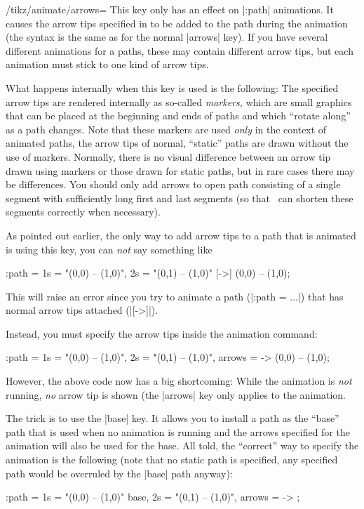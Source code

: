 \begin{key}{/tikz/animate/arrows=}
    This key only has an effect on |:path| animations. It causes the arrow tips
    specified in  to be added to the path during the animation
    (the syntax is the same as for the normal |arrows| key). If you have
    several different animations for a paths, these may contain different arrow
    tips, but each animation must stick to one kind of arrow tips.

    What happens internally when this key is used is the following: The
    specified arrow tips are rendered internally as so-called \emph{markers,}
    which are small graphics that can be placed at the beginning and ends of
    paths and which ``rotate along'' as a path changes. Note that these markers
    are used \emph{only} in the context of animated paths, the arrow tips of
    normal, ``static'' paths are drawn without the use of markers. Normally,
    there is no visual difference between an arrow tip drawn using markers or
    those drawn for static paths, but in rare cases there may be differences.
    You should only add arrows to open path consisting of a single segment with
    sufficiently long first and last segments (so that \tikzname\ can shorten
    these segments correctly when necessary).

    As pointed out earlier, the only way to add arrow tips to a path that is
    animated is using this key, you can \emph{not} say something like
\begin{codeexample}
\draw :path = { 1s = "{(0,0) -- (1,0)}", 2s = "{(0,1) -- (1,0)}" }
  [->] (0,0) -- (1,0);
\end{codeexample}
    This will raise an error since you try to animate a path (|:path = ...|)
    that has normal arrow tips attached (|[->]|).

    Instead, you must specify the arrow tips inside the animation command:
\begin{codeexample}
\draw :path = { 1s = "{(0,0) -- (1,0)}", 2s = "{(0,1) -- (1,0)}", arrows = -> }
  (0,0) -- (1,0);
\end{codeexample}

    However, the above code now has a big shortcoming: While the animation is
    \emph{not} running, \emph{no} arrow tip is shown (the |arrows| key only
    applies to the animation.

    The trick is to use the |base| key. It allows you to install a path as the
    ``base'' path that is used when no animation is running and the arrows
    specified for the animation will also be used for the base. All told, the
    ``correct'' way to specify the animation is the following (note that no
    static path is specified, any specified path would be overruled by the
    |base| path anyway):
\begin{codeexample}
\draw :path = { 1s = "{(0,0) -- (1,0)}" base, 2s = "{(0,1) -- (1,0)}", arrows = -> };
\end{codeexample}


\end{key}
